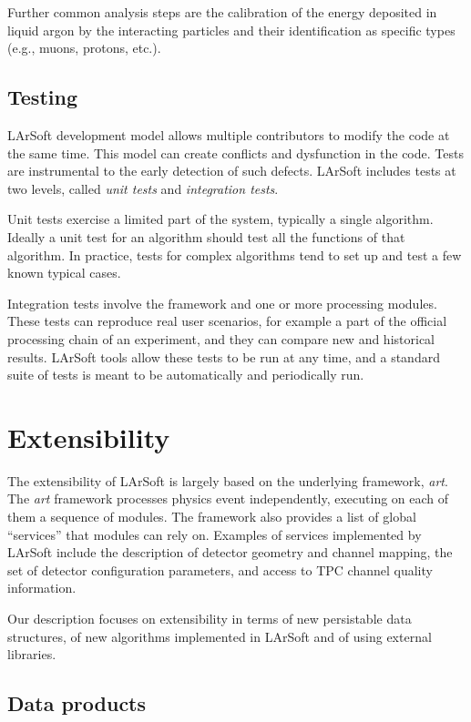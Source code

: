 \documentclass{article}
\begin{document}
Further common analysis steps are the calibration of the energy
deposited in liquid argon by the interacting particles and their
identification as specific types (e.g., muons, protons, etc.).

\subsection{Testing}\label{testing}

LArSoft development model allows multiple contributors to modify the
code at the same time. This model can create conflicts and dysfunction
in the code. Tests are instrumental to the early detection of such
defects. LArSoft includes tests at two levels, called \emph{unit tests}
and \emph{integration tests}.

Unit tests exercise a limited part of the system, typically a single
algorithm. Ideally a unit test for an algorithm should test all the
functions of that algorithm. In practice, tests for complex algorithms
tend to set up and test a few known typical cases.

Integration tests involve the framework and one or more processing
modules. These tests can reproduce real user scenarios, for example a
part of the official processing chain of an experiment, and they can
compare new and historical results. LArSoft tools allow these tests to
be run at any time, and a standard suite of tests is meant to be
automatically and periodically run.

\section{Extensibility}\label{extensibility}

The extensibility of LArSoft is largely based on the underlying
framework, \emph{art}. The \emph{art} framework processes physics event
independently, executing on each of them a sequence of modules. The
framework also provides a list of global ``services'' that modules can
rely on. Examples of services implemented by LArSoft include the
description of detector geometry and channel mapping, the set of
detector configuration parameters, and access to TPC channel quality
information.

Our description focuses on extensibility in terms of new persistable
data structures, of new algorithms implemented in LArSoft and of using
external libraries.

\subsection{Data products}\label{data-products}
\end{document}
